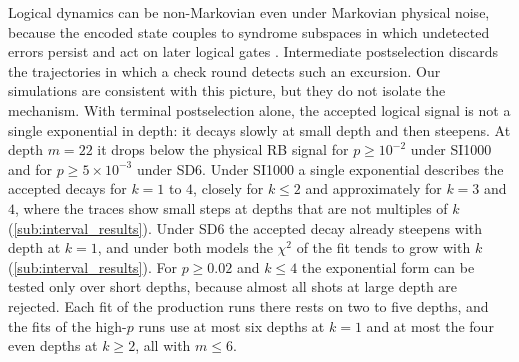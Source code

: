Logical dynamics can be non-Markovian even under Markovian physical noise, because the encoded state couples to syndrome subspaces in which undetected errors persist and act on later logical gates \cite{Ziyad2025}. Intermediate postselection discards the trajectories in which a check round detects such an excursion. Our simulations are consistent with this picture, but they do not isolate the mechanism. With terminal postselection alone, the accepted logical signal is not a single exponential in depth: it decays slowly at small depth and then steepens. At depth $m = 22$ it drops below the physical RB signal for $p \geq 10^{-2}$ under SI1000 and for $p \geq 5\times 10^{-3}$ under SD6. Under SI1000 a single exponential describes the accepted decays for $k = 1$ to $4$, closely for $k \le 2$ and approximately for $k = 3$ and $4$, where the traces show small steps at depths that are not multiples of $k$ (\autoref{sub:interval_results}). Under SD6 the accepted decay already steepens with depth at $k = 1$, and under both models the $\chi^2$ of the fit tends to grow with $k$ (\autoref{sub:interval_results}). For $p \geq 0.02$ and $k \le 4$ the exponential form can be tested only over short depths, because almost all shots at large depth are rejected. Each fit of the production runs there rests on two to five depths, and the fits of the high-$p$ runs use at most six depths at $k = 1$ and at most the four even depths at $k \ge 2$, all with $m \le 6$.